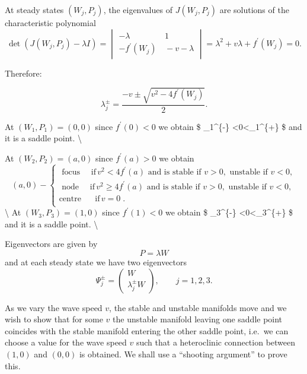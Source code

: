 \documentclass[
  letterpaper,
  DIV=11,
  numbers=noendperiod]{scrreprt}
\theoremstyle{definition}
\theoremstyle{plain}
\theoremstyle{plain}
\theoremstyle{remark}
\begin{document}
At steady states \((W_j, P_j)\), the eigenvalues of \(J(W_j,P_j)\) are
solutions of the characteristic polynomial \[
\det(J(W_j,P_j) - \lambda I) = \begin{vmatrix} -\lambda & \, 1\\
- f^\prime(W_j) & \, -v - \lambda
\end{vmatrix} = \lambda^2 + v \lambda + f^\prime(W_j) = 0 .
\]

Therefore:

\[
 \lambda^{\pm}_j = \frac{ - v \pm \sqrt{ v^2 - 4 f^\prime(W_j)}}2.
\]

At \((W_1, P_1)=(0,0)\) since \(f^\prime(0) <0\) we obtain \$
\lambda\_1\^{}\{-\} \textless0\textless{}\lambda\_1\^{}\{+\} \$ and it
is a saddle point. \textbackslash{}

At \((W_2, P_2)=(a,0)\) since \(f^\prime(a) >0\) we obtain \[
 (a,0) - \begin{cases}
 \text{ focus} \quad \text{ if} \, v^2 < 4 f^\prime(a) \text{ and is stable if } v>0,   \text{ unstable if } v<0, \\
  \text{ node} \quad \text{ if} \, v^2 \geq 4 f^\prime(a) \text{ and is stable if } v>0,   \text{ unstable if } v<0, \\
   \text{centre } \quad \text{ if} \, v=0 \; . \\
 \end{cases}
 \] \textbackslash{} At \((W_3, P_3)=(1,0)\) since \(f^\prime(1) <0\) we
obtain \$ \lambda\_3\^{}\{-\} \textless0\textless{}\lambda\_3\^{}\{+\}
\$ and it is a saddle point. \textbackslash{}

Eigenvectors are given by \[
 P =\lambda W
\] and at each steady state we have two eigenvectors \[
 \Psi_j^{\pm} = \begin{pmatrix}
 W\\
 \lambda_j^\pm W
 \end{pmatrix} , \qquad  j=1,2, 3.
\]

As we vary the wave speed \(v\), the stable and unstable manifolds move
and we wish to show that for some \(v\) the unstable manifold leaving
one saddle point coincides with the stable manifold entering the other
saddle point, i.e.~we can choose a value for the wave speed \(v\) such
that a heteroclinic connection between \((1,0)\) and \((0,0)\) is
obtained. We shall use a ``shooting argument'' to prove this.
\end{document}
